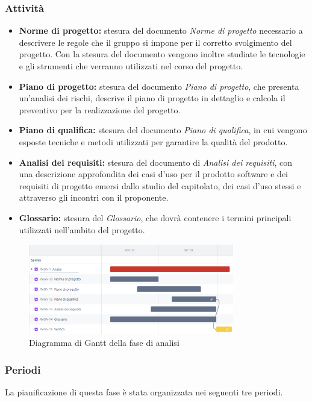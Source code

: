 \subsubsection{Attività}\label{sec:pianificazione:analisi:attivita}
\begin{itemize}
    \item \textbf{Norme di progetto:} stesura del documento \textit{Norme di progetto} necessario a descrivere le regole che il gruppo si impone per il corretto svolgimento del progetto. Con la stesura del documento vengono inoltre studiate le tecnologie e gli strumenti che verranno utilizzati nel corso del progetto.
    \item \textbf{Piano di progetto:} stesura del documento \textit{Piano di progetto}, che presenta un'analisi dei rischi, descrive il piano di progetto in dettaglio e calcola il preventivo per la realizzazione del progetto.
    \item \textbf{Piano di qualifica:} stesura del documento \textit{Piano di qualifica}, in cui vengono esposte tecniche e metodi utilizzati per garantire la qualità del prodotto.
    \item \textbf{Analisi dei requisiti:} stesura del documento di \textit{Analisi dei requisiti}, con una descrizione approfondita dei casi d'uso per il prodotto software e dei requisiti di progetto emersi dallo studio del capitolato, dei casi d'uso stessi e attraverso gli incontri con il proponente.
    \item \textbf{Glossario:} stesura del \textit{Glossario}, che dovrà contenere i termini principali utilizzati nell'ambito del progetto.
\end{itemize}
\begin{figure}[H]
    \centering
    \includegraphics[width=0.8\textwidth]{images/gantt_analisi.PNG}
    \caption{Diagramma di Gantt della fase di analisi}
    \label{fig:gantt_analisi}
\end{figure}

\subsubsection{Periodi}\label{sec:pianificazione:analisi:periodi}
La pianificazione di questa fase è stata organizzata nei seguenti tre periodi.

